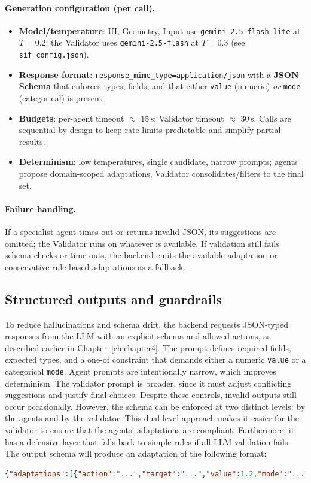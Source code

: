 \documentclass[openany]{book}
\begin{document}
\paragraph{Generation configuration (per call).}
\begin{itemize}
  \item \textbf{Model/temperature}: UI, Geometry, Input use \texttt{gemini-2.5-flash-lite} at $T{=}0.2$; the Validator uses \texttt{gemini-2.5-flash} at $T{=}0.3$ (see \texttt{sif\_config.json}).
  \item \textbf{Response format}: \texttt{response\_mime\_type=application/json} with a \textbf{JSON Schema} that enforces types, fields, and that either \texttt{value} (numeric) \emph{or} \texttt{mode} (categorical) is present.
  \item \textbf{Budgets}: per-agent timeout $\approx$ 15\,s; Validator timeout $\approx$ 30\,s. Calls are sequential by design to keep rate-limits predictable and simplify partial results.
  \item \textbf{Determinism}: low temperatures, single candidate, narrow prompts; agents propose domain-scoped adaptations, Validator consolidates/filters to the final set.
\end{itemize}

\paragraph{Failure handling.}
If a specialist agent times out or returns invalid JSON, its suggestions are omitted; the Validator runs on whatever is available. If validation still fails schema checks or time outs, the backend emits the available adaptation or conservative rule-based adaptations as a fallback.

\subsection{Structured outputs and guardrails}
To reduce hallucinations and schema drift, the backend requests JSON‑typed responses from the LLM with an explicit schema and allowed actions, as described earlier in Chapter~\ref{ch:chapter4}. The prompt defines required fields, expected types, and a one‑of constraint that demands either a numeric \texttt{value} or a categorical \texttt{mode}. Agent prompts are intentionally narrow, which improves determinism. The validator prompt is broader, since it must adjust conflicting suggestions and justify final choices. Despite these controls, invalid outputs still occur occasionally. However, the schema can be enforced at two distinct levels: by the agents and by the validator. This dual-level approach makes it easier for the validator to ensure that the agents' adaptations are compliant. Furthermore, it has a defensive layer that falls back to simple rules if all LLM validation fails.
The output schema will produce an adaptation of the following format:
\begin{lstlisting}[language=json,basicstyle=\ttfamily\small,caption={Example adaptation Format}]
{"adaptations":[{"action":"...","target":"...","value":1.2,"mode":"...","reason":"...","intent":"..."}]}
\end{lstlisting}
\end{document}
